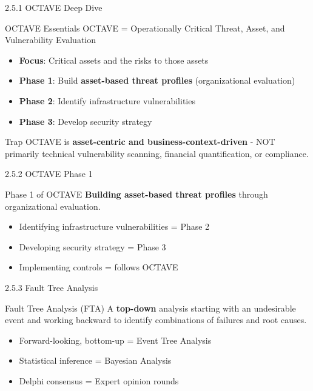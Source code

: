 \documentclass{beamer}
\begin{document}
	\begin{frame}{2.5.1 OCTAVE Deep Dive}
		\begin{block}{OCTAVE Essentials}
			OCTAVE = Operationally Critical Threat, Asset, and Vulnerability Evaluation
		\end{block}
		\begin{itemize}
			\item \textbf{Focus}: Critical assets and the risks to those assets
			\item \textbf{Phase 1}: Build \textbf{asset-based threat profiles} (organizational evaluation)
			\item \textbf{Phase 2}: Identify infrastructure vulnerabilities
			\item \textbf{Phase 3}: Develop security strategy
		\end{itemize}
		\begin{alertblock}{Trap}
			OCTAVE is \textbf{asset-centric and business-context-driven} - NOT primarily technical vulnerability scanning, financial quantification, or compliance.
		\end{alertblock}
	\end{frame}
	
	\begin{frame}{2.5.2 OCTAVE Phase 1}
		\begin{block}{Phase 1 of OCTAVE}
			\textbf{Building asset-based threat profiles} through organizational evaluation.
		\end{block}
		\begin{itemize}
			\item Identifying infrastructure vulnerabilities = Phase 2
			\item Developing security strategy = Phase 3
			\item Implementing controls = follows OCTAVE
		\end{itemize}
	\end{frame}
	
	\begin{frame}{2.5.3 Fault Tree Analysis}
		\begin{block}{Fault Tree Analysis (FTA)}
			A \textbf{top-down} analysis starting with an undesirable event and working backward to identify combinations of failures and root causes.
		\end{block}
		\begin{itemize}
			\item Forward-looking, bottom-up = Event Tree Analysis
			\item Statistical inference = Bayesian Analysis
			\item Delphi consensus = Expert opinion rounds
		\end{itemize}
	\end{frame}
	
\end{document}
